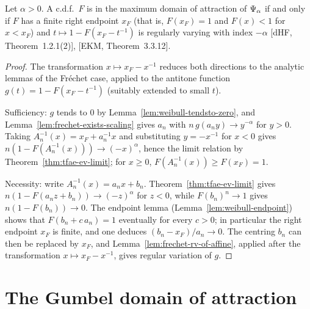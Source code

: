 \begin{theorem}
  \label{thm:mda-weibull-iff}
  \leanok
  Let $\alpha > 0$. A c.d.f.\ $F$ is in the maximum domain of attraction of $\Psi_{\alpha}$
  if and only if $F$ has a finite right endpoint $x_F$ (that is, $F(x_F) = 1$ and $F(x) < 1$ for
  $x < x_F$) and $t \mapsto 1 - F(x_F - t^{-1})$ is regularly varying with index $-\alpha$
  [dHF, Theorem~1.2.1(2)], [EKM, Theorem~3.3.12].
\end{theorem}
\begin{proof}
  \leanok
  The transformation $x \mapsto x_F - x^{-1}$ reduces both directions to the analytic lemmas
  of the Fréchet case, applied to the antitone function $g(t) = 1 - F(x_F - t^{-1})$
  (suitably extended to small $t$).

  Sufficiency: $g$ tends to $0$ by Lemma~\ref{lem:weibull-tendsto-zero}, and
  Lemma~\ref{lem:frechet-exists-scaling} gives $a_n$ with $n \, g(a_n y) \to y^{-\alpha}$ for
  $y > 0$. Taking $A_n^{-1}(x) = x_F + a_n^{-1} x$ and substituting $y = -x^{-1}$ for $x < 0$
  gives $n (1 - F(A_n^{-1}(x))) \to (-x)^\alpha$, hence the limit relation by
  Theorem~\ref{thm:tfae-ev-limit}; for $x \ge 0$, $F(A_n^{-1}(x)) \ge F(x_F) = 1$.

  Necessity: write $A_n^{-1}(x) = a_n x + b_n$. Theorem~\ref{thm:tfae-ev-limit} gives
  $n (1 - F(a_n z + b_n)) \to (-z)^\alpha$ for $z < 0$, while $F(b_n)^n \to 1$ gives
  $n (1 - F(b_n)) \to 0$. The endpoint lemma (Lemma~\ref{lem:weibull-endpoint}) shows that
  $F(b_n + c \, a_n) = 1$ eventually for every $c > 0$; in particular the right endpoint
  $x_F$ is finite, and one deduces $(b_n - x_F)/a_n \to 0$. The centring $b_n$ can then be
  replaced by $x_F$, and Lemma~\ref{lem:frechet-rv-of-affine}, applied after the
  transformation $x \mapsto x_F - x^{-1}$, gives regular variation of $g$.
\end{proof}


\section{The Gumbel domain of attraction}


